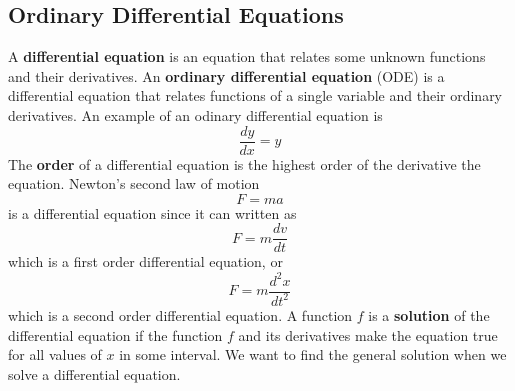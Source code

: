 \subsection{Ordinary Differential Equations}
A \textbf{differential equation} is an equation that relates some unknown
functions and their derivatives.
An \textbf{ordinary differential equation} (ODE) is a differential equation
that relates functions of a single variable and their ordinary derivatives.
An example of an odinary differential equation is \[\frac{dy}{dx}=y\]
The \textbf{order} of a differential equation is the highest order of the
derivative the equation.
Newton's second law of motion \[F=ma\] is a differential equation since it can
written as \[F=m\frac{dv}{dt}\] which is a first order differential equation,
or \[F=m\frac{d^2x}{dt^2}\] which is a second order differential equation.
A function \(f\) is a \textbf{solution} of the differential equation if the
function \(f\) and its derivatives make the equation true for all values of
\(x\) in some interval.
We want to find the general solution when we solve a differential equation.
